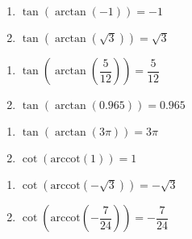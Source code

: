 \begin{multicols}{2}

\begin{enumerate}

\setcounter{enumi}{\value{HW}}

\item $\tan\left(\arctan\left(-1\right)\right) = -1$
\item $\tan\left(\arctan\left(\sqrt{3}\right)\right) = \sqrt{3}$

\setcounter{HW}{\value{enumi}}

\end{enumerate}

\end{multicols}

\begin{multicols}{2}

\begin{enumerate}

\setcounter{enumi}{\value{HW}}

\item $\tan\left(\arctan\left(\dfrac{5}{12}\right)\right) = \dfrac{5}{12}$
\item $\tan\left(\arctan\left(0.965\right)\right) = 0.965$ 

\setcounter{HW}{\value{enumi}}

\end{enumerate}

\end{multicols}

\begin{multicols}{2}

\begin{enumerate}

\setcounter{enumi}{\value{HW}}

\item $\tan\left(\arctan\left( 3\pi \right)\right) = 3\pi$
\item $\cot\left(\text{arccot}\left(1\right)\right) = 1$

\setcounter{HW}{\value{enumi}}

\end{enumerate}

\end{multicols}

\begin{multicols}{2}

\begin{enumerate}

\setcounter{enumi}{\value{HW}}

\item $\cot\left(\text{arccot}\left(-\sqrt{3}\right)\right) = -\sqrt{3}$ 
\item $\cot\left(\text{arccot}\left(-\dfrac{7}{24}\right)\right) = -\dfrac{7}{24}$

\setcounter{HW}{\value{enumi}}

\end{enumerate}

\end{multicols}

